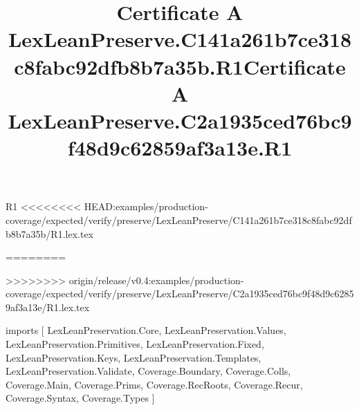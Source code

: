 \begin{lexlean}{R1}
<<<<<<<< HEAD:examples/production-coverage/expected/verify/preserve/LexLeanPreserve/C141a261b7ce318c8fabc92dfb8b7a35b/R1.lex.tex
\title{Certificate A LexLeanPreserve.C141a261b7ce318c8fabc92dfb8b7a35b.R1}
========
\title{Certificate A LexLeanPreserve.C2a1935ced76bc9f48d9c62859af3a13e.R1}
>>>>>>>> origin/release/v0.4:examples/production-coverage/expected/verify/preserve/LexLeanPreserve/C2a1935ced76bc9f48d9c62859af3a13e/R1.lex.tex
\begin{coremodule}
imports [
  LexLeanPreservation.Core,
  LexLeanPreservation.Values,
  LexLeanPreservation.Primitives,
  LexLeanPreservation.Fixed,
  LexLeanPreservation.Keys,
  LexLeanPreservation.Templates,
  LexLeanPreservation.Validate,
  Coverage.Boundary,
  Coverage.Colls,
  Coverage.Main,
  Coverage.Prims,
  Coverage.RecRoots,
  Coverage.Recur,
  Coverage.Syntax,
  Coverage.Types
]


\end{coremodule}
\end{lexlean}
